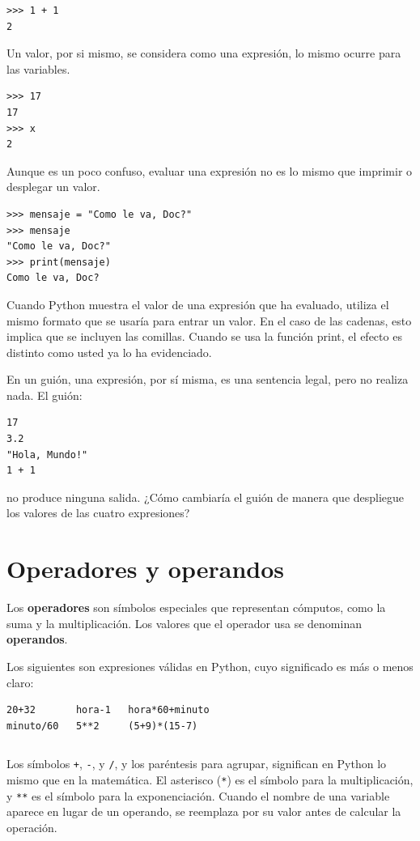 \begin{verbatim}
>>> 1 + 1
2
\end{verbatim}


Un valor, por si mismo, se considera como una expresión, lo mismo
ocurre para las variables.

\begin{verbatim}
>>> 17
17
>>> x
2
\end{verbatim}


Aunque es un poco confuso, evaluar una expresión no es lo mismo que
imprimir o desplegar un valor.

\begin{verbatim}
>>> mensaje = "Como le va, Doc?"
>>> mensaje
"Como le va, Doc?"
>>> print(mensaje)
Como le va, Doc?
\end{verbatim}


Cuando Python muestra el valor de una expresión que ha evaluado, utiliza
el mismo formato que se usaría para entrar un valor. En el caso de
las cadenas, esto implica que se incluyen las comillas. Cuando se
usa la función print, el efecto es distinto como usted ya lo ha evidenciado.

En un guión, una expresión, por sí misma, es una sentencia legal,
pero no realiza nada. El guión:

\begin{verbatim}
17
3.2
"Hola, Mundo!"
1 + 1
\end{verbatim}


no produce ninguna salida. ¿Cómo cambiaría el guión de manera que
despliegue los valores de las cuatro expresiones?

\section{Operadores y operandos}

  

Los \textbf{operadores} son símbolos especiales que representan cómputos,
como la suma y la multiplicación. Los valores que el operador usa
se denominan \textbf{operandos}.

Los siguientes son expresiones válidas en Python, cuyo significado
es más o menos claro: 

\begin{verbatim}
20+32       hora-1   hora*60+minuto   
minuto/60   5**2     (5+9)*(15-7)
\end{verbatim}
\begin{verbatim}

\end{verbatim}
Los símbolos \texttt{+}, \texttt{-}, y \texttt{/}, y los paréntesis
para agrupar, significan en Python lo mismo que en la matemática.
El asterisco (\texttt{{*}}) es el símbolo para la multiplicación,
y \texttt{{*}{*}} es el símbolo para la exponenciación. Cuando el
nombre de una variable aparece en lugar de un operando, se reemplaza
por su valor antes de calcular la operación.

